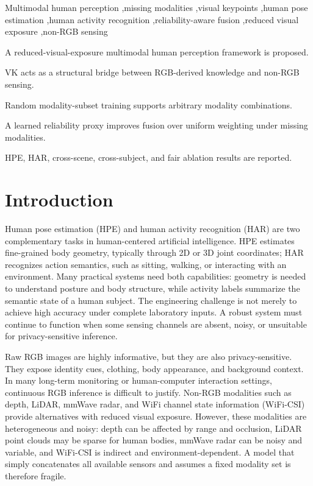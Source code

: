 \documentclass[preprint,12pt]{elsarticle}
\begin{document}
\begin{frontmatter}
\begin{keyword}
Multimodal human perception \sep missing modalities \sep visual keypoints \sep human pose estimation \sep human activity recognition \sep reliability-aware fusion \sep reduced visual exposure \sep non-RGB sensing
\end{keyword}

\end{frontmatter}

\begin{highlights}
\item A reduced-visual-exposure multimodal human perception framework is proposed.
\item VK acts as a structural bridge between RGB-derived knowledge and non-RGB sensing.
\item Random modality-subset training supports arbitrary modality combinations.
\item A learned reliability proxy improves fusion over uniform weighting under missing modalities.
\item HPE, HAR, cross-scene, cross-subject, and fair ablation results are reported.
\end{highlights}

\section{Introduction}

Human pose estimation (HPE) and human activity recognition (HAR) are two complementary tasks in human-centered artificial intelligence. HPE estimates fine-grained body geometry, typically through 2D or 3D joint coordinates; HAR recognizes action semantics, such as sitting, walking, or interacting with an environment. Many practical systems need both capabilities: geometry is needed to understand posture and body structure, while activity labels summarize the semantic state of a human subject. The engineering challenge is not merely to achieve high accuracy under complete laboratory inputs. A robust system must continue to function when some sensing channels are absent, noisy, or unsuitable for privacy-sensitive inference.

Raw RGB images are highly informative, but they are also privacy-sensitive. They expose identity cues, clothing, body appearance, and background context. In many long-term monitoring or human-computer interaction settings, continuous RGB inference is difficult to justify. Non-RGB modalities such as depth, LiDAR, mmWave radar, and WiFi channel state information (WiFi-CSI) provide alternatives with reduced visual exposure. However, these modalities are heterogeneous and noisy: depth can be affected by range and occlusion, LiDAR point clouds may be sparse for human bodies, mmWave radar can be noisy and variable, and WiFi-CSI is indirect and environment-dependent. A model that simply concatenates all available sensors and assumes a fixed modality set is therefore fragile.
\end{document}
